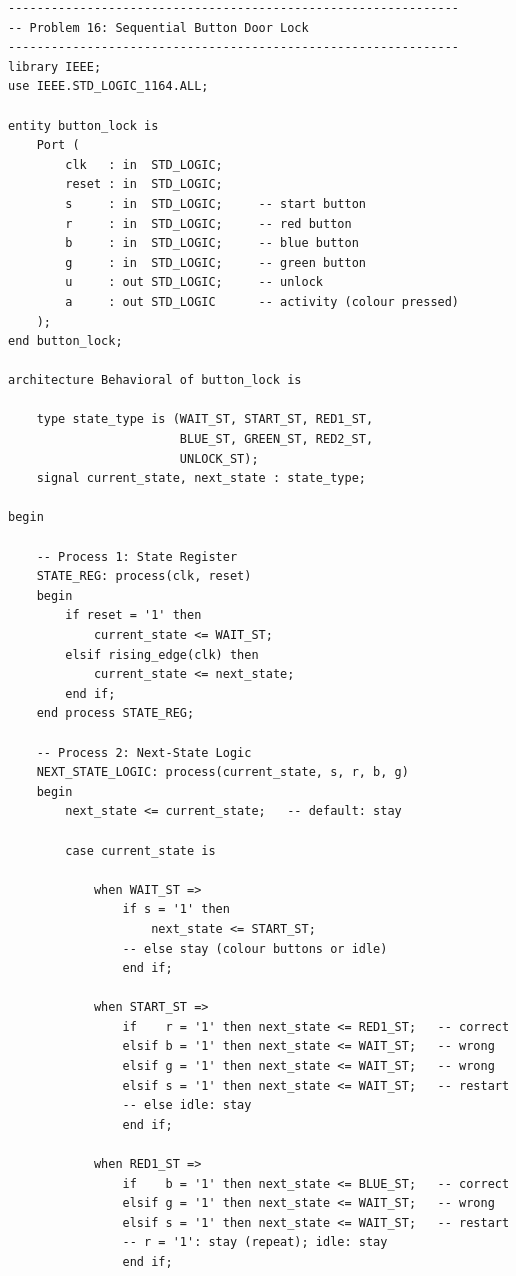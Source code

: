 \documentclass[12pt,a4paper]{article}
\begin{document}
{\small
\begin{verbatim}
---------------------------------------------------------------
-- Problem 16: Sequential Button Door Lock
---------------------------------------------------------------
library IEEE;
use IEEE.STD_LOGIC_1164.ALL;

entity button_lock is
    Port (
        clk   : in  STD_LOGIC;
        reset : in  STD_LOGIC;
        s     : in  STD_LOGIC;     -- start button
        r     : in  STD_LOGIC;     -- red button
        b     : in  STD_LOGIC;     -- blue button
        g     : in  STD_LOGIC;     -- green button
        u     : out STD_LOGIC;     -- unlock
        a     : out STD_LOGIC      -- activity (colour pressed)
    );
end button_lock;

architecture Behavioral of button_lock is

    type state_type is (WAIT_ST, START_ST, RED1_ST,
                        BLUE_ST, GREEN_ST, RED2_ST,
                        UNLOCK_ST);
    signal current_state, next_state : state_type;

begin

    -- Process 1: State Register
    STATE_REG: process(clk, reset)
    begin
        if reset = '1' then
            current_state <= WAIT_ST;
        elsif rising_edge(clk) then
            current_state <= next_state;
        end if;
    end process STATE_REG;

    -- Process 2: Next-State Logic
    NEXT_STATE_LOGIC: process(current_state, s, r, b, g)
    begin
        next_state <= current_state;   -- default: stay

        case current_state is

            when WAIT_ST =>
                if s = '1' then
                    next_state <= START_ST;
                -- else stay (colour buttons or idle)
                end if;

            when START_ST =>
                if    r = '1' then next_state <= RED1_ST;   -- correct
                elsif b = '1' then next_state <= WAIT_ST;   -- wrong
                elsif g = '1' then next_state <= WAIT_ST;   -- wrong
                elsif s = '1' then next_state <= WAIT_ST;   -- restart
                -- else idle: stay
                end if;

            when RED1_ST =>
                if    b = '1' then next_state <= BLUE_ST;   -- correct
                elsif g = '1' then next_state <= WAIT_ST;   -- wrong
                elsif s = '1' then next_state <= WAIT_ST;   -- restart
                -- r = '1': stay (repeat); idle: stay
                end if;


\end{verbatim}}
\end{document}
